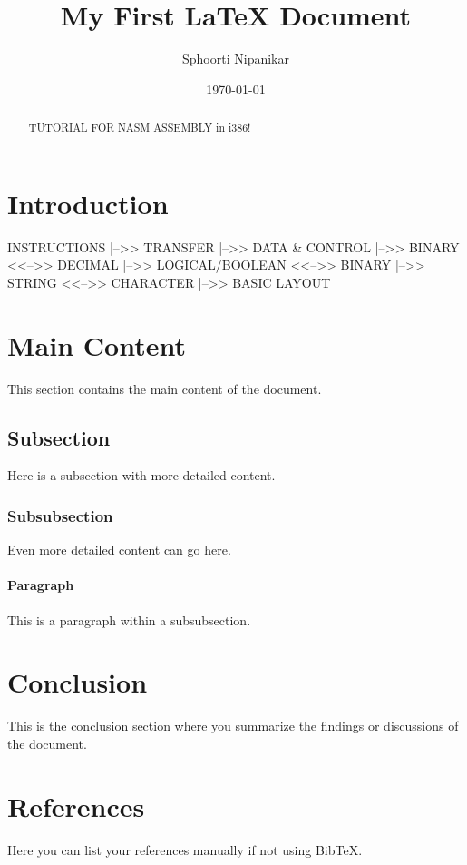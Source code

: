 \documentclass[a4paper,12pt]{article}
\title{My First LaTeX Document}
\author{Sphoorti Nipanikar}
\date{\today}                 %
\begin{document}
\maketitle

\begin{abstract}
TUTORIAL FOR NASM ASSEMBLY in i386!
\end{abstract}

\section{Introduction}
INSTRUCTIONS |-->> TRANSFER |-->> DATA & CONTROL
             |-->> BINARY <<-->> DECIMAL
             |-->> LOGICAL/BOOLEAN <<-->> BINARY
             |-->> STRING <<-->> CHARACTER
             |-->> BASIC LAYOUT

\section{Main Content}
This section contains the main content of the document.

\subsection{Subsection}
Here is a subsection with more detailed content.

\subsubsection{Subsubsection}
Even more detailed content can go here.

\paragraph{Paragraph}
This is a paragraph within a subsubsection.

\section{Conclusion}
This is the conclusion section where you summarize the findings or discussions of the document.

\section*{References}
% 
% 

Here you can list your references manually if not using BibTeX.
\end{document}
